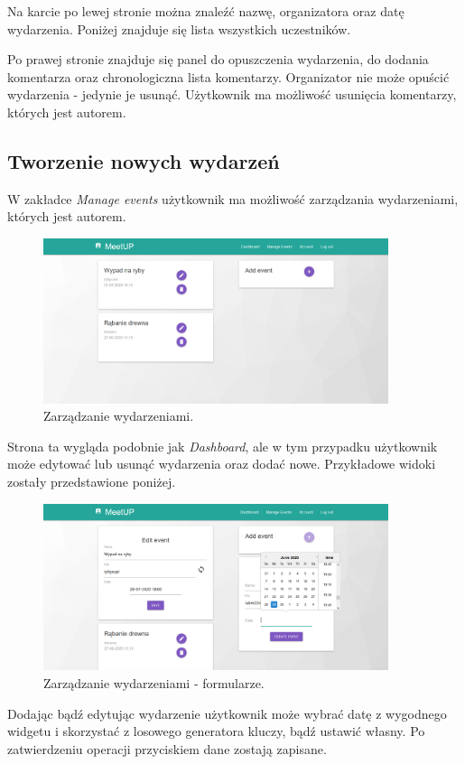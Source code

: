 \documentclass[12pt]{article}
\begin{document}
Na karcie po lewej stronie można znaleźć nazwę, organizatora oraz datę wydarzenia. Poniżej znajduje się lista wszystkich uczestników.

Po prawej stronie znajduje się panel do opuszczenia wydarzenia, do dodania komentarza oraz chronologiczna lista komentarzy. Organizator nie może opuścić wydarzenia - jedynie je usunąć. Użytkownik ma możliwość usunięcia komentarzy, których jest autorem.

\subsection{Tworzenie nowych wydarzeń}

W zakładce \textit{Manage events} użytkownik ma możliwość zarządzania wydarzeniami, których jest autorem.

\begin{figure}[H]
\centering
\includegraphics[width=0.9\textwidth]{meetup_manage.png}
\caption{Zarządzanie wydarzeniami.}
\end{figure}

Strona ta wygląda podobnie jak \textit{Dashboard}, ale w tym przypadku użytkownik może edytować lub usunąć wydarzenia oraz dodać nowe. Przykładowe widoki zostały przedstawione poniżej.

\begin{figure}[H]
\centering
\includegraphics[width=0.9\textwidth]{meetup_manage_form.png}
\caption{Zarządzanie wydarzeniami - formularze.}
\end{figure}

Dodając bądź edytując wydarzenie użytkownik może wybrać datę z wygodnego widgetu i skorzystać z losowego generatora kluczy, bądź ustawić własny. Po zatwierdzeniu operacji przyciskiem dane zostają zapisane.
\end{document}

